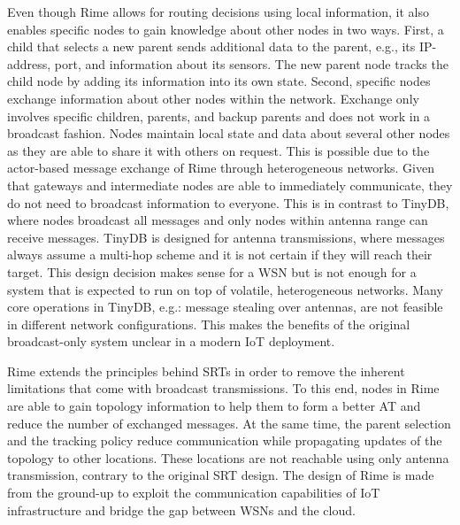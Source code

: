 Even though Rime allows for routing decisions using local information, it also enables specific nodes to gain knowledge about other nodes in two ways. First, a child 
that selects a new parent sends additional data to the parent, e.g., its IP-address, port, and information about its sensors.
The new parent node tracks the child node by adding its information into its own state.
Second, specific nodes exchange information about other nodes within the network. Exchange only involves specific children, parents, and backup parents and does not work in a broadcast fashion.
Nodes maintain local state and data about several other nodes as they are 
able to share it with others on request.
%
This is possible due to the actor-based message exchange of Rime through heterogeneous networks.
Given that gateways and intermediate nodes are able to immediately communicate, they do not need to broadcast information to everyone.
This is in contrast to TinyDB, where nodes broadcast all messages and only 
nodes within antenna range can receive messages. TinyDB is designed for antenna transmissions,
where messages always assume a multi-hop scheme and it is not certain if they will
reach their target. This design decision makes sense for a WSN but is not
enough for a system that is expected to run on top of volatile, heterogeneous networks.
Many core operations in TinyDB, e.g.: message stealing over antennas, are not
feasible in different network configurations. This makes the benefits of the original
broadcast-only system unclear in a modern IoT deployment.

Rime extends the principles behind SRTs in order to remove the
inherent limitations that come with broadcast transmissions.
To this end, nodes in Rime are able to gain topology information to help them to 
form a better AT and reduce the number of exchanged messages.
At the same time, the parent selection and the tracking policy 
reduce communication while propagating updates of the
topology to other locations. These locations are not reachable
using only antenna transmission, contrary to the original SRT design.
The design of Rime is made from the ground-up to exploit
the communication capabilities of IoT infrastructure and bridge the gap between WSNs and the cloud.

